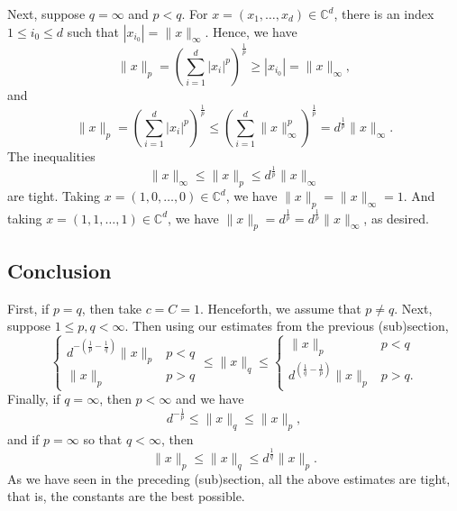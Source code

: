 \documentclass[10pt]{amsart}
\theoremstyle{thmstyle}
\theoremstyle{defstyle}
\newcommand{\bbC}{\mathbb{C}}
\renewcommand{\le}{\leqslant}
\renewcommand{\ge}{\geqslant}
\begin{document}
Next, suppose $q = \infty$ and $p < q$. For $x = (x_1,\dots,x_d)\in\bbC^d$, there is an index $1\le i_0\le d$ such that $|x_{i_0}| = \|x\|_\infty$. Hence, we have 
\begin{equation*}
	\|x\|_p = \left(\sum_{i = 1}^d |x_i|^p\right)^{\frac{1}{p}}\ge|x_{i_0}| = \|x\|_\infty,
\end{equation*}
and
\begin{equation*}
	\|x\|_p = \left(\sum_{i = 1}^d |x_i|^p\right)^{\frac{1}{p}}\le\left(\sum_{i = 1}^d \|x\|_\infty^p\right)^{\frac{1}{p}} = d^{\frac{1}{p}}\|x\|_\infty.
\end{equation*}
The inequalities 
\begin{equation*}
	\|x\|_\infty\le \|x\|_p\le d^{\frac{1}{p}}\|x\|_\infty
\end{equation*}
are tight. Taking $x = (1,0,\dots, 0)\in\bbC^d$, we have $\|x\|_p = \|x\|_\infty = 1$. And taking $x = (1,1,\dots,1)\in\bbC^d$, we have $\|x\|_p = d^{\frac{1}{p}} = d^{\frac{1}{p}}\|x\|_\infty$, as desired.

\subsection*{Conclusion}

First, if $p = q$, then take $c = C = 1$. Henceforth, we assume that $p \ne q$. Next, suppose $1\le p, q < \infty$. Then using our estimates from the previous (sub)section,
\begin{equation*}
	\begin{cases}
		d^{-\left(\frac{1}{p} - \frac{1}{q}\right)}\|x\|_p & p < q\\
		\|x\|_p & p > q
	\end{cases}
	\le \|x\|_q\le
	\begin{cases}
		\|x\|_p & p < q\\
		d^{\left(\frac{1}{q} - \frac{1}{p}\right)}\|x\|_p & p > q.
	\end{cases}
\end{equation*}
Finally, if $q = \infty$, then $p < \infty$ and we have 
\begin{equation*}
	d^{-\frac{1}{p}}\le \|x\|_q\le \|x\|_p,
\end{equation*}
and if $p = \infty$ so that $q < \infty$, then 
\begin{equation*}
	\|x\|_p\le \|x\|_q\le d^{\frac{1}{q}}\|x\|_p.
\end{equation*}
As we have seen in the preceding (sub)section, all the above estimates are tight, that is, the constants are the best possible. 
\end{document}
